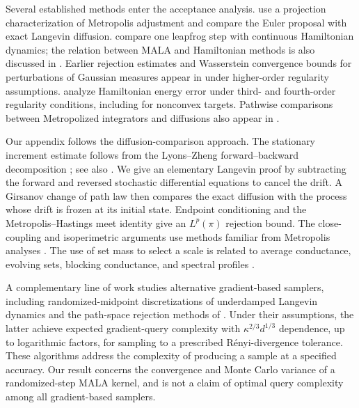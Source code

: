 \documentclass[11pt]{article}
\newcommand{\1}{\mathbf 1}
\begin{document}
	Several established methods enter the acceptance analysis.
	 use a projection characterization of Metropolis
	adjustment and compare the Euler proposal with exact Langevin diffusion.
	 compare one leapfrog step with continuous
	Hamiltonian dynamics; the relation between MALA and Hamiltonian methods
	is also discussed in \citet{Neal2011,ChenGatmiry2023}.
	Earlier rejection estimates and Wasserstein convergence bounds for
	perturbations of Gaussian measures appear in \citet{Eberle2014} under
	higher-order regularity assumptions.  analyze
	Hamiltonian energy error under third- and fourth-order regularity
	conditions, including for nonconvex targets. Pathwise comparisons
	between Metropolized integrators and diffusions also appear in
	\citet{BouRabeeVandenEijnden2010,BouRabeeHairer2013}.
	
	Our appendix follows the diffusion-comparison approach. The stationary
	increment estimate follows from the Lyons--Zheng forward--backward
	decomposition \citep[Section~1, especially equation~(1.7)]{LyonsZheng1988};
	see also \citet[Theorem~5.7.1]{FukushimaOshimaTakeda2011}.
	We give an elementary Langevin proof by subtracting the forward and
	reversed stochastic differential equations to cancel the drift.
	A Girsanov change of path law then compares the exact diffusion with the
	process whose drift is frozen at its initial state. Endpoint conditioning
	and the Metropolis--Hastings meet identity
	\citep{Tierney1998,BilleraDiaconis2001} give an $L^p(\pi)$ rejection bound.
	The close-coupling and isoperimetric arguments use methods familiar from
	Metropolis analyses
	\citep{DwivediEtAl2019,WuSchmidlerChen2022,AndrieuLeePowerWang2024,LiuTong2026}.
	The use of set mass to select a scale is related to average conductance,
	evolving sets, blocking conductance, and spectral profiles
	\citep{LovaszKannan1999,MorrisPeres2005,GoelMontenegroTetali2006,KannanLovaszMontenegro2006,Montenegro2007}.
	
	A complementary line of work studies alternative gradient-based
	samplers, including randomized-midpoint discretizations of underdamped
	Langevin dynamics \citep{ShenLee2019} and the path-space rejection
	methods of \citet{ChenChewiRakhlinZhang2026}. Under their assumptions,
	the latter achieve expected gradient-query complexity with
	$\kappa^{2/3}d^{1/3}$ dependence, up to logarithmic factors, for sampling
	to a prescribed R\'enyi-divergence tolerance. 
	These algorithms address the complexity of producing a sample at a
	specified accuracy. Our result concerns the convergence and Monte Carlo
	variance of a randomized-step MALA kernel, and is not a claim of
	optimal query complexity among all gradient-based samplers.
	
\end{document}
